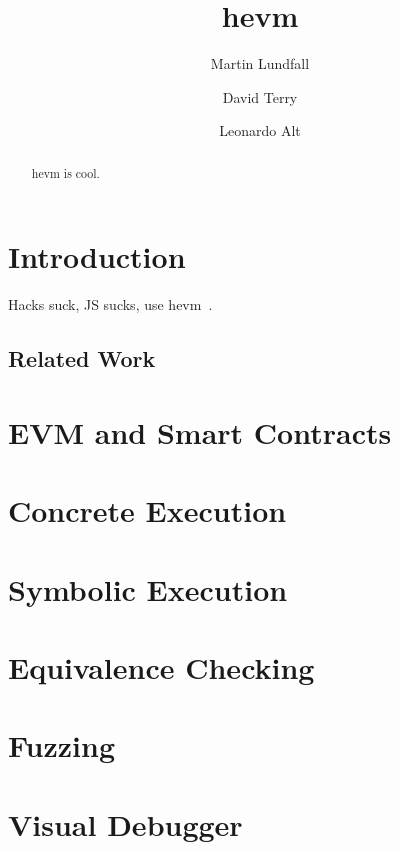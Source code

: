 \documentclass[runningheads]{llncs}
\begin{document}
%
\title{hevm}
%
\author{Martin Lundfall \and
David Terry \and
Leonardo Alt}
%
%

%
\maketitle              %
%
\begin{abstract}
hevm is cool.

\end{abstract}
%
%
%
\section{Introduction}
Hacks suck, JS sucks, use hevm~\cite{hevm}.

\subsection{Related Work}

\section{EVM and Smart Contracts}

\section{Concrete Execution}

\section{Symbolic Execution}

\section{Equivalence Checking}

\section{Fuzzing}

\section{Visual Debugger}
\end{document}
